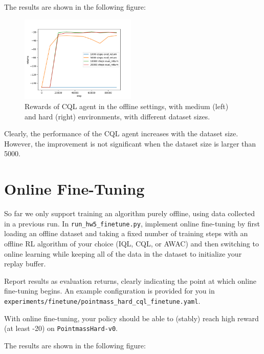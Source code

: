 \documentclass{article}
\begin{document}
\MYSOLUTION The results are shown in the following figure:

\begin{figure}[H]
    \centering
    \includegraphics[width=0.49\textwidth]{../report/assets/4.3.png}
    \caption{Rewards of CQL agent in the offline settings, with medium (left) and hard (right) environments, with different dataset sizes.}
\end{figure}

Clearly, the performance of the CQL agent increases with the dataset size. However, the improvement is not significant when the dataset size is larger than 5000.

\section{Online Fine-Tuning}
So far we only support training an algorithm purely offline, using data collected in a previous run. In \verb+run_hw5_finetune.py+, implement online fine-tuning by first loading an offline dataset and taking a fixed number of training steps with an offline RL algorithm of your choice (IQL, CQL, or AWAC) and then switching to online learning while keeping all of the data in the dataset to initialize your replay buffer.

Report results as evaluation returns, clearly indicating the point at which online fine-tuning begins. An example configuration is provided for you in \verb+experiments/finetune/pointmass_hard_cql_finetune.yaml+.

With online fine-tuning, your policy should be able to (stably) reach high reward (at least -20) on \verb+PointmassHard-v0+.

\MYSOLUTION The results are shown in the following figure:
\end{document}
